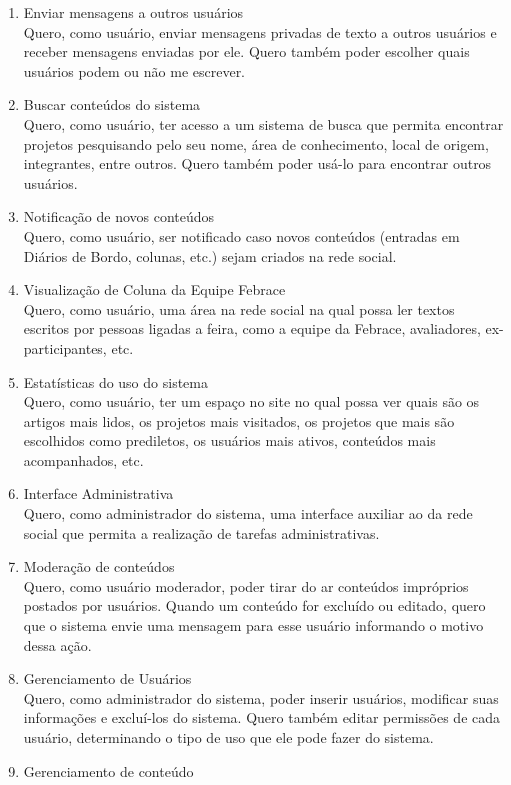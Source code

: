 \begin{enumerate}
      \item Enviar mensagens a outros usuários \\
        Quero, como usuário, enviar mensagens privadas de texto a outros usuários e receber mensagens enviadas por ele. Quero também poder escolher quais usuários podem ou não me escrever.
      \item Buscar conteúdos do sistema \\
        Quero, como usuário, ter acesso a  um sistema de busca que permita encontrar projetos pesquisando pelo seu nome, área de conhecimento, local de origem, integrantes, entre outros. Quero também poder usá-lo para encontrar outros usuários.
      \item Notificação de novos conteúdos \\
        Quero, como usuário, ser notificado caso novos conteúdos (entradas em Diários de Bordo, colunas, etc.) sejam criados na rede social.
      \item Visualização de Coluna da Equipe Febrace \\
        Quero, como usuário, uma área na rede social na qual possa ler textos escritos por pessoas ligadas a feira, como a equipe da Febrace, avaliadores, ex-participantes, etc.
      \item Estatísticas do uso do sistema \\
        Quero, como usuário, ter um espaço no site no qual possa ver quais são os artigos mais lidos, os projetos mais visitados, os projetos que mais são escolhidos como prediletos, os usuários mais ativos, conteúdos mais acompanhados, etc.
      \item Interface Administrativa \\
        Quero, como administrador do sistema, uma interface auxiliar ao da rede social que permita a realização de tarefas administrativas.
      \item Moderação de conteúdos \\
        Quero, como usuário moderador, poder tirar do ar conteúdos impróprios postados por usuários. Quando um conteúdo for excluído ou editado, quero que o sistema envie uma mensagem para esse usuário informando o motivo dessa ação.
      \item Gerenciamento de Usuários \\
        Quero, como administrador do sistema, poder inserir usuários, modificar suas informações e excluí-los do sistema. Quero também editar permissões de cada usuário, determinando o tipo de uso que ele pode fazer do sistema.
      \item Gerenciamento de conteúdo \\

\end{enumerate}
